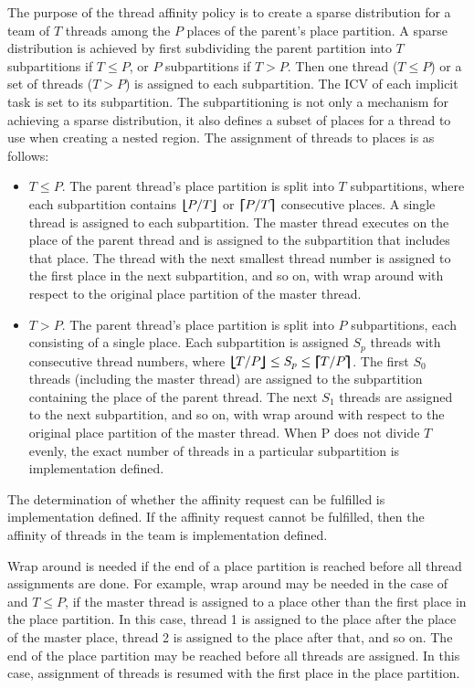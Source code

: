 The purpose of the  thread affinity policy is to create a sparse distribution for a
team of $T$ threads among the $P$ places of the parent's place partition. A sparse distribution is achieved
by first subdividing the parent partition into $T$ subpartitions if
$T\leq P$, or $P$ subpartitions if $T>P$. Then one thread ($T\leq P$) or a
set of threads ($T>P$) is assigned to each subpartition. The
 ICV of each implicit task is set to its subpartition.
The subpartitioning is not only a mechanism for achieving a sparse
distribution, it also defines a subset of places for a thread to use when
creating a nested  region. The assignment of threads to places is as
follows:

\begin{itemize}
\item $T\leq P$. The parent thread's place partition is split into $T$ subpartitions, where each subpartition
contains $\bm{\lfloor\mkern-10mu\lfloor} P/T \bm{\rfloor\mkern-10mu\rfloor}$ or $\bm{\lceil\mkern-10mu\lceil} P/T \bm{\rceil\mkern-10mu\rceil}$ consecutive places. A single thread is assigned to each subpartition. The master thread executes on the place of the parent thread and is assigned to the subpartition that includes that place. The thread with the next smallest thread number is assigned to the first place in the next subpartition, and so on, with wrap around with respect to the original place partition of the master thread.

\item $T>P$. The parent thread's place partition is split into $P$ subpartitions, each consisting of a single place. Each subpartition is assigned $S_{p}$ threads with consecutive thread numbers, where $\blfloor T/P \brfloor \leq S_{p} \leq \blceil T/P \brceil$. The first $S_{0}$ threads (including the master thread) are assigned to the subpartition containing the place of the parent thread. The next $S_{1}$ threads are assigned to the next subpartition, and so on, with wrap around with respect to the original place partition of the master thread. When P does not divide $T$ evenly, the exact number of threads in a particular subpartition is implementation defined.
\end{itemize}

The determination of whether the affinity request can be fulfilled is implementation defined. If the affinity request cannot be fulfilled, then the affinity of threads in the team is implementation defined.

\begin{note}
Wrap around is needed if the end of a place partition is reached before all thread assignments are done. For example, wrap around may be needed in the case of  and $T\leq P$, if the master thread is assigned to a place other than the first place in the place partition. In this case, thread 1 is assigned to the place after the place of the master place, thread 2 is assigned to the place after that, and so on. The end of the place partition may be reached before all threads are assigned. In this case, assignment of threads is resumed with the first place in the place partition.
\end{note}

